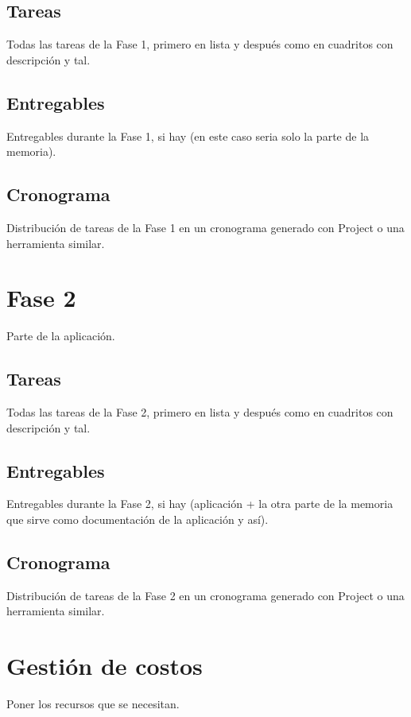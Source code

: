 \subsection{Tareas}
{\color{red} Todas las tareas de la Fase 1, primero en lista y después como en cuadritos con descripción y tal.}

\subsection{Entregables}
{\color{red} Entregables durante la Fase 1, si hay (en este caso seria solo la parte de la memoria).}

\subsection{Cronograma}
{\color{red} Distribución de tareas de la Fase 1 en un cronograma generado con Project o una herramienta similar.}


\section{Fase 2}
{\color{red} Parte de la aplicación.}

\subsection{Tareas}
{\color{red} Todas las tareas de la Fase 2, primero en lista y después como en cuadritos con descripción y tal.}

\subsection{Entregables}
{\color{red} Entregables durante la Fase 2, si hay (aplicación + la otra parte de la memoria que sirve como documentación de la aplicación y así).}

\subsection{Cronograma}
{\color{red} Distribución de tareas de la Fase 2 en un cronograma generado con Project o una herramienta similar.}


\section{Gestión de costos}
{\color{red} Poner los recursos que se necesitan.}

